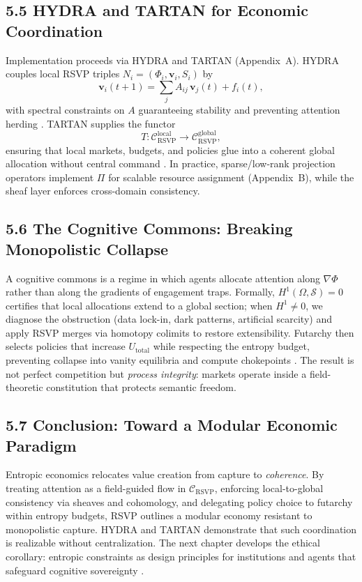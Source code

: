 \documentclass[12pt]{article}
\begin{document}
\subsection*{5.5 HYDRA and TARTAN for Economic Coordination}

Implementation proceeds via HYDRA and TARTAN (Appendix~A). HYDRA couples local
RSVP triples \(N_i=(\Phi_i,\mathbf{v}_i,S_i)\) by
\[
\mathbf{v}_i(t+1) = \sum_j A_{ij}\,\mathbf{v}_j(t) + f_i(t),
\]
with spectral constraints on \(A\) guaranteeing stability and preventing attention
herding \citep{bird1988}. TARTAN supplies the functor
\[
T:\mathcal{C}_{\text{RSVP}}^{\mathrm{local}} \to
\mathcal{C}_{\text{RSVP}}^{\mathrm{global}},
\]
ensuring that local markets, budgets, and policies glue into a coherent global allocation
without central command \citep{milewski2018}. In practice, sparse/low-rank projection
operators implement \(\Pi\) for scalable resource assignment (Appendix~B), while the
sheaf layer enforces cross-domain consistency.

\subsection*{5.6 The Cognitive Commons: Breaking Monopolistic Collapse}

A cognitive commons is a regime in which agents allocate attention along \(\nabla\Phi\)
rather than along the gradients of engagement traps. Formally,
\(H^1(\Omega,\mathcal{S})=0\) certifies that local allocations extend to a global section;
when \(H^1\neq 0\), we diagnose the obstruction (data lock-in, dark patterns, artificial
scarcity) and apply RSVP merges via homotopy colimits to restore extensibility.
Futarchy then selects policies that increase \(U_{\mathrm{total}}\) while respecting the
entropy budget, preventing collapse into vanity equilibria and compute chokepoints
\citep{lanier2018}. The result is not perfect competition but \emph{process integrity}:
markets operate inside a field-theoretic constitution that protects semantic freedom.

\subsection*{5.7 Conclusion: Toward a Modular Economic Paradigm}

Entropic economics relocates value creation from capture to \emph{coherence}.
By treating attention as a field-guided flow in \(\mathcal{C}_{\text{RSVP}}\),
enforcing local-to-global consistency via sheaves and cohomology, and delegating policy
choice to futarchy within entropy budgets, RSVP outlines a modular economy
resistant to monopolistic capture. HYDRA and TARTAN demonstrate that such coordination
is realizable without centralization. The next chapter develops the ethical corollary:
entropic constraints as design principles for institutions and agents that safeguard
cognitive sovereignty \citep{whitehead1978, deleuze1987}.
\end{document}

